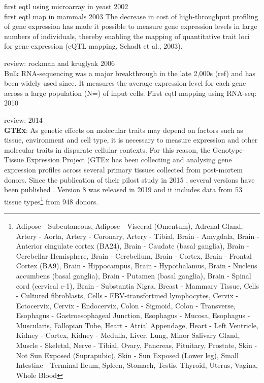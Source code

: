 first eqtl using microarray in yeast 2002 \cite{brem2002genetic}\\

first eqtl map in mammals 2003
The decrease in cost of high-throughput profiling of gene expression has made it possible to measure gene expression levels in large numbers of individuals, thereby enabling the mapping of quantitative trait loci for gene expression (eQTL mapping, Schadt et al., 2003). \cite{schadt2003genetics}

review: rockman and kruglyak 2006 \cite{rockman2006genetics}\\

Bulk RNA-sequencing was a major breakthrough in the late 2,000s (ref) and has been widely used since.
It measures the average expression level for each gene across a large population (N=) of input cells. 
First eqtl mapping using RNA-seq: 2010
\cite{montgomery2010transcriptome, pickrell2010understanding}

review: 2014 \cite{westra2014genome}\\

\textbf{GTEx}:
As genetic effects on molecular traits may depend on factors such as tissue, environment and cell type, it is necessary to measure expression and other molecular traits in disparate cellular contexts. 
For this reason, the Genotype-Tissue Expression Project (GTEx has been collecting and analysing gene expression profiles across several primary tissues collected from post-mortem donors.
Since the publication of their pilost study in 2015 \cite{gtex2015genotype}, several versions have been published \cite{gtex2017genetic, aguet2019gtex}.
Version 8 was released in 2019 and it includes data from 53 tissue types\footnote{Adipose - Subcutaneous, Adipose - Visceral (Omentum), Adrenal Gland, Artery - Aorta, Artery - Coronary, Artery - Tibial, 
Brain - Amygdala, Brain - Anterior cingulate cortex (BA24), Brain - Caudate (basal ganglia), Brain - Cerebellar Hemisphere, Brain - Cerebellum, Brain - Cortex, Brain - Frontal Cortex (BA9), Brain - Hippocampus, Brain - Hypothalamus, Brain - Nucleus accumbens (basal ganglia), Brain - Putamen (basal ganglia), Brain - Spinal cord (cervical c-1), Brain - Substantia Nigra, 
Breast - Mammary Tissue, Cells - Cultured fibroblasts, Cells - EBV-transfortmed lymphocytes,  Cervix - Ectocervix, Cervix - Endocervix, Colon - Sigmoid, Colon - Transverse, Esophagus - Gastroesophageal Junction, Esophagus - Mucosa, Esophagus - Muscularis, Fallopian Tube, Heart - Atrial Appendage, Heart - Left Ventricle, Kidney - Cortex, Kidney - Medulla, Liver, Lung,  Minor Salivary Gland, Muscle - Skeletal, Nerve - Tibial, Ovary, Pancreas, Pituitary, Prostate,  Skin - Not Sun Exposed (Suprapubic), Skin - Sun Exposed (Lower leg), Small Intestine - Terminal Ileum, Spleen, Stomach, Testis, Thyroid, Uterus, Vagina, Whole Blood} from 948 donors.

